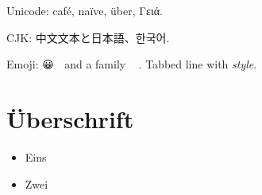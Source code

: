 ﻿\documentclass{article}
\begin{document}
Unicode: café, naïve, über, Γειά.

CJK: 中文文本と日本語、한국어.

Emoji: 😀 🚀 and a family 👨‍👩‍👧.
	Tabbed line with \textit{style}.

\section{Überschrift}

\begin{itemize}
  \item Eins
  \item Zwei
\end{itemize}
\end{document}
